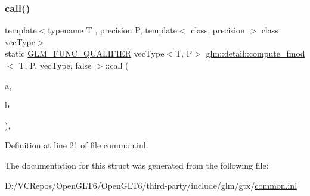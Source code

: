 \subsubsection{\texorpdfstring{call()}{call()}}
{\footnotesize\ttfamily template$<$typename T , precision P, template$<$ class, precision $>$ class vec\+Type$>$ \\
static \mbox{\hyperlink{setup_8hpp_a33fdea6f91c5f834105f7415e2a64407}{G\+L\+M\+\_\+\+F\+U\+N\+C\+\_\+\+Q\+U\+A\+L\+I\+F\+I\+ER}} vec\+Type$<$T, P$>$ \mbox{\hyperlink{structglm_1_1detail_1_1compute__fmod}{glm\+::detail\+::compute\+\_\+fmod}}$<$ T, P, vec\+Type, false $>$\+::call (\begin{DoxyParamCaption}\item[{vec\+Type$<$ T, P $>$ const \&}]{a,  }\item[{vec\+Type$<$ T, P $>$ const \&}]{b }\end{DoxyParamCaption})\hspace{0.3cm}{\ttfamily [inline]}, {\ttfamily [static]}}



Definition at line 21 of file common.\+inl.



The documentation for this struct was generated from the following file\+:\begin{DoxyCompactItemize}
\item 
D\+:/\+V\+C\+Repos/\+Open\+G\+L\+T6/\+Open\+G\+L\+T6/third-\/party/include/glm/gtx/\mbox{\hyperlink{common_8inl}{common.\+inl}}\end{DoxyCompactItemize}
